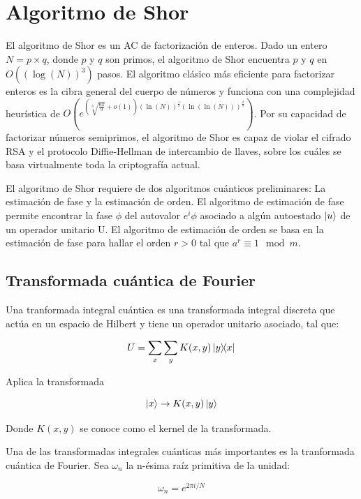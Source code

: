 \chapter{Algoritmo de Shor}
El algoritmo de Shor es un AC de factorización de enteros. Dado un entero $N=p \times q$, donde $p$ y $q$ son primos, el algoritmo de Shor encuentra $p$ y $q$ en $O((\log(N))^3)$ pasos. El algoritmo clásico más eficiente para factorizar enteros es la cibra general del cuerpo de números y funciona con una complejidad heurística de $O(e^{(\sqrt[3]{\frac{64}{9}}+o(1))(\ln(N))^{\frac{1}{3}}(\ln(\ln(N)))^{\frac{2}{3}}})$. Por su capacidad de factorizar números semiprimos, el algoritmo de Shor es capaz de violar el cifrado RSA y el protocolo Diffie-Hellman de intercambio de llaves, sobre los cuáles se basa virtualmente toda la criptografía actual.

El algoritmo de Shor requiere de dos algoritmos cuánticos preliminares: La estimación de fase y la estimación de orden. El algoritmo de estimación de fase permite encontrar la fase $\phi$ del autovalor $e^i \phi$ asociado a algún autoestado $\ket{u}$ de un operador unitario U. El algoritmo de estimación de orden se basa en la estimación de fase para hallar el orden $r>0$ tal que $a^r \equiv 1 \mod m$.

\section{Transformada cuántica de Fourier}

Una tranformada integral cuántica es una transformada integral discreta que actúa en un espacio de Hilbert y tiene un operador unitario asociado, tal que:

\begin{equation}
    U = \sum\limits_x\sum\limits_y K(x,y) \ketbra{y}{x}
\end{equation}

Aplica la transformada

\begin{equation}
    \ket{x} \rightarrow K(x,y) \ket{y}
\end{equation}

Donde $K(x,y)$ se conoce como el kernel de la transformada.

Una de las transformadas integrales cuánticas más importantes es la tranformada cuántica de Fourier. Sea $\omega_n$ la n-ésima raíz primitiva de la unidad:

\begin{equation}
    \omega_n = e^{2\pi i/N}
\end{equation}

